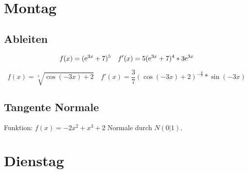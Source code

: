 
\everymath{\displaystyle}


\section{Montag}
\subsection{Ableiten}

\begin{equation*}
  f(x)=(\mathrm{e}^{3x}+7)^5\quad f'(x)=5(\mathrm{e}^{3x}+7)^4*3\mathrm{e}^{3x}
\end{equation*}

\begin{equation*}
  f(x)=\sqrt[7]{\cos(-3x)+2} \quad f'(x)=\frac 3 7(\cos(-3x)+2)^{-\frac{6}{7}}*\sin(-3x)
\end{equation*}

\subsection{Tangente Normale}
Funktion: $f(x)=-2x^2+x^3+2$ Normale durch $N(0|1)$.





\section{Dienstag}


